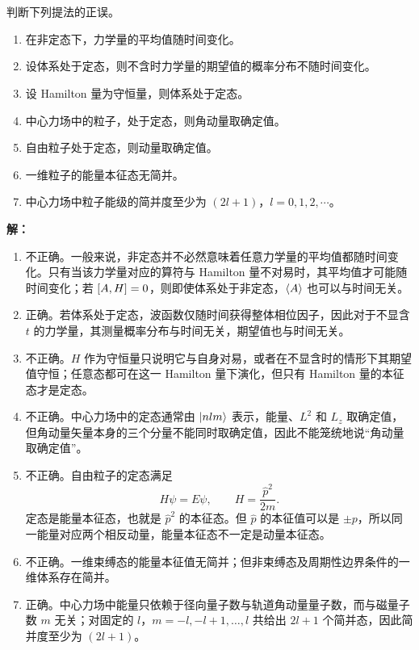 \documentclass[12pt,a4paper]{article}
\begin{document}
\maketitle

\section{}

判断下列提法的正误。
\begin{enumerate}[label=(\alph*)]
    \item 在非定态下，力学量的平均值随时间变化。
    \item 设体系处于定态，则不含时力学量的期望值的概率分布不随时间变化。
    \item 设 Hamilton 量为守恒量，则体系处于定态。
    \item 中心力场中的粒子，处于定态，则角动量取确定值。
    \item 自由粒子处于定态，则动量取确定值。
    \item 一维粒子的能量本征态无简并。
    \item 中心力场中粒子能级的简并度至少为 $\left( 2l+1 \right)$，$l=0,1,2,\cdots$。
\end{enumerate}

\vspace{0.5cm}
\noindent\textbf{解：}
\begin{enumerate}[label=(\alph*)]
    \item 不正确。一般来说，非定态并不必然意味着任意力学量的平均值都随时间变化。只有当该力学量对应的算符与 Hamilton 量不对易时，其平均值才可能随时间变化；若 $\comm{A}{H}=0$，则即使体系处于非定态，$\expval{A}$ 也可以与时间无关。
    \item 正确。若体系处于定态，波函数仅随时间获得整体相位因子，因此对于不显含 $t$ 的力学量，其测量概率分布与时间无关，期望值也与时间无关。
    \item 不正确。$H$ 作为守恒量只说明它与自身对易，或者在不显含时的情形下其期望值守恒；任意态都可在这一 Hamilton 量下演化，但只有 Hamilton 量的本征态才是定态。
    \item 不正确。中心力场中的定态通常由 $\ket{n l m}$ 表示，能量、$L^2$ 和 $L_z$ 取确定值，但角动量矢量本身的三个分量不能同时取确定值，因此不能笼统地说``角动量取确定值''。
    \item 不正确。自由粒子的定态满足
    \[
    H\psi=E\psi,\qquad H=\frac{\hat{p}^2}{2m}.
    \]
    定态是能量本征态，也就是 \(\hat p^2\) 的本征态。但 \(\hat p\) 的本征值可以是 \(\pm p\)，所以同一能量对应两个相反动量，能量本征态不一定是动量本征态。
    \item 不正确。一维束缚态的能量本征值无简并；但非束缚态及周期性边界条件的一维体系存在简并。
    \item 正确。中心力场中能量只依赖于径向量子数与轨道角动量量子数，而与磁量子数 $m$ 无关；对固定的 $l$，$m=-l,-l+1,\dots,l$ 共给出 $2l+1$ 个简并态，因此简并度至少为 $\left( 2l+1 \right)$。
\end{enumerate}
\end{document}
